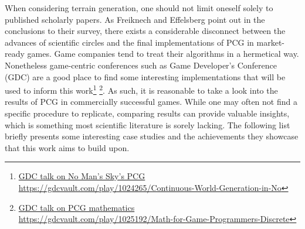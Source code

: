When considering terrain generation, one should not limit oneself solely to published scholarly papers.
As Freiknech and Effelsberg \cite{Freiknecht:2017:SPG} point out in the conclusions to their survey, there exists a considerable disconnect between the advances of scientific circles and the final implementations of PCG in market-ready games.
Game companies tend to treat their algorithms in a hermetical way.
Nonetheless game-centric conferences such as Game Developer's Conference (GDC) are a good place to find some interesting implementations that will be used to inform this work\footnote{\href{https://gdcvault.com/play/1024265/Continuous-World-Generation-in-No}{GDC talk on No Man's Sky's PCG}\\ \hspace*{1.9em}\url{https://gdcvault.com/play/1024265/Continuous-World-Generation-in-No}} \footnote{\href{https://gdcvault.com/play/1025192/Math-for-Game-Programmers-Discrete}{GDC talk on PCG mathematics}\\ \hspace*{1.9em}\url{https://gdcvault.com/play/1025192/Math-for-Game-Programmers-Discrete}}.
As such, it is reasonable to take a look into the results of PCG in commercially successful games. 
While one may often not find a specific procedure to replicate, comparing results can provide valuable insights, which is something most scientific literature is sorely lacking.
The following list briefly presents some interesting case studies and the achievements they showcase that this work aims to build upon.

